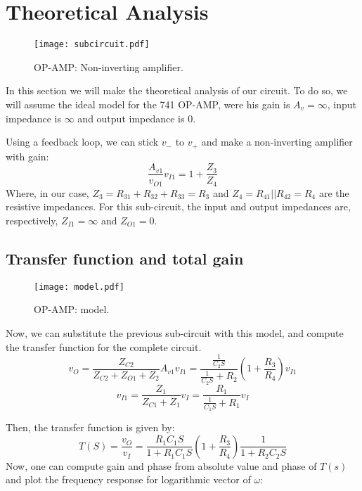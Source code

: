 \section{Theoretical Analysis}
\label{sec:analysis}

\begin{figure}[h] \centering
  \texttt{[image: subcircuit.pdf]}
  \caption{OP-AMP: Non-inverting amplifier.}
  \label{fig:subcircuit}
\end{figure}

\par In this section we will make the theoretical analysis of our circuit. To do so, we will assume the ideal model for the 741 OP-AMP, were his gain is $A_v=\infty$, input impedance is $\infty$ and output impedance is $0$.

\par Using a feedback loop, we can stick $v_-$ to $v_+$ and make a non-inverting amplifier with gain: 
\begin{equation}
  \frac{A_{v1}}{v_{O1}}{v_{I1}}=1+\frac{Z_3}{Z_4}
\end{equation}
Where, in our case, $Z_3=R_{31}+R_{32}+R_{33}=R_3$ and $Z_4=R_{41}||R_{42}=R_4$ are the resistive impedances. For this sub-circuit, the input and output impedances are, respectively, $Z_{I1}=\infty$ and $Z_{O1}=0$. 

\subsection{Transfer function and total gain}

\begin{figure}[h] \centering
  \texttt{[image: model.pdf]}
  \caption{OP-AMP: model.}
  \label{fig:model}
\end{figure}

\par Now, we can substitute the previous sub-circuit with this model, and compute the transfer function for the complete circuit. 
\begin{equation}
  v_O=\frac{Z_{C2}}{Z_{C2}+Z_{O1}+Z_{2}}A_{v1}v_{I1}=\frac{\frac{1}{C_2S}}{\frac{1}{C_2S}+R_2}(1+\frac{R_3}{R_4})v_{I1}
\end{equation}
\begin{equation}
  v_{I1}=\frac{Z_{1}}{Z_{C1}+Z_{1}}v_{I}=\frac{R_1}{\frac{1}{C_1S}+R_1}v_{I}
\end{equation}

Then, the transfer function is given by:
\begin{equation}
  T(S)=\frac{v_O}{v_I}=\frac{R_1C_1S}{1+R_1C_1S}(1+\frac{R_3}{R_4})\frac{1}{1+R_2C_2S}
\end{equation}
 Now, one can compute gain and phase from absolute value and phase of $T(s)$ and plot the frequency response for logarithmic vector of $\omega$:
 

